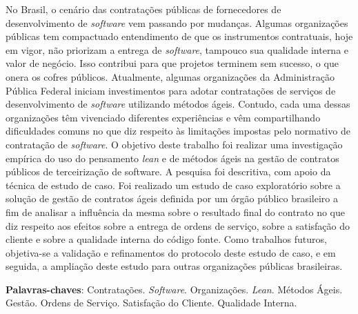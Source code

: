 \begin{resumo}
No Brasil, o cenário das contratações públicas de fornecedores de desenvolvimento de \textit{software} vem passando por mudanças. Algumas organizações públicas tem compactuado entendimento de que os instrumentos contratuais, hoje em vigor, não priorizam a entrega de \textit{software}, tampouco sua qualidade interna e valor de negócio. Isso contribui para que projetos terminem sem sucesso, o que onera os cofres públicos. Atualmente, algumas organizações da Administração Pública Federal iniciam investimentos para adotar contratações de serviços de desenvolvimento de \textit{software} utilizando métodos ágeis. Contudo, cada uma dessas organizações têm vivenciado diferentes experiências e vêm compartilhando dificuldades comuns no que diz respeito às limitações impostas pelo normativo de contratação de \textit{software}.  O objetivo deste trabalho foi realizar uma investigação empírica do uso do pensamento \textit{lean} e de métodos ágeis na gestão de contratos públicos de terceirização de software. A pesquisa foi descritiva, com apoio da técnica de estudo de caso. Foi realizado um estudo de caso exploratório sobre a solução de gestão de contratos ágeis definida por um órgão público brasileiro a fim de analisar a influência da mesma sobre o resultado final do contrato no que diz respeito aos efeitos sobre a entrega de ordens de serviço, sobre a satisfação do cliente e sobre a qualidade interna do código fonte. Como trabalhos futuros, objetiva-se a validação e refinamentos do protocolo deste estudo de caso, e em seguida, a ampliação deste estudo para outras organizações públicas brasileiras.

\vspace{\onelineskip}
    
 \noindent
 \textbf{Palavras-chaves}:  Contratações. \textit{Software}. Organizações. \textit{Lean}. Métodos Ágeis. Gestão. Ordens de Serviço. Satisfação do Cliente. Qualidade Interna.
\end{resumo}
